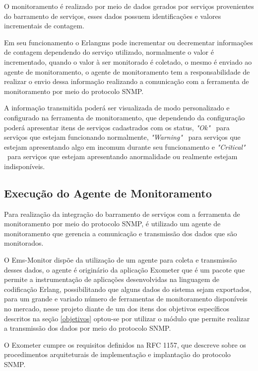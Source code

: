 O monitoramento é realizado por meio de dados gerados por serviços provenientes do barramento de serviços, esses dados possuem identificações e valores incrementais de contagem. 

Em seu funcionamento o Erlangms pode incrementar ou decrementar informações de contagem dependendo do serviço utilizado, normalmente o valor é incrementado, quando o valor à ser monitorado é coletado, o mesmo é enviado ao agente de monitoramento, o agente de monitoramento tem a responsabilidade de realizar o envio dessa informação realizando a comunicação com a ferramenta de monitoramento por meio do protocolo \acrshort{SNMP}. 

A informação transmitida poderá ser visualizada de modo personalizado e configurado na ferramenta de monitoramento, que dependendo da configuração poderá apresentar itens de serviços cadastrados com os status, \textit{"Ok"} \ para serviços que estejam funcionando normalmente, \textit{"Warning"} \  para serviços que estejam apresentando algo em incomum durante seu funcionamento e \textit{"Critical"} \ para serviços que estejam apresentando anormalidade ou realmente estejam indisponíveis.	 


\subsection{Execução do Agente de Monitoramento}

Para realização da integração do barramento de serviços com a ferramenta de monitoramento por meio do protocolo \acrshort{SNMP}, é utilizado um agente de monitoramento que gerencia a comunicação e transmissão dos dados que são monitorados. 

O Ems-Monitor dispõe da utilização de um agente para coleta e transmissão desses dados, o agente é originário da aplicação Exometer que é um pacote que permite a instrumentação de aplicações desenvolvidas na linguagem de codificação Erlang, possibilitando que alguns dados do sistema sejam exportados, para um grande e variado número de ferramentas de monitoramento disponíveis no mercado\cite{exometer_core}, nesse projeto diante de um dos itens dos objetivos específicos descritos na seção \ref{objetivos} optou-se por utilizar o módulo que permite realizar a transmissão dos dados por meio do protocolo \acrshort{SNMP}. 

O Exometer cumpre os requisitos definidos na \acrshort{RFC} 1157, que descreve sobre os procedimentos arquiteturais de implementação e implantação do protocolo \acrshort{SNMP}. 

